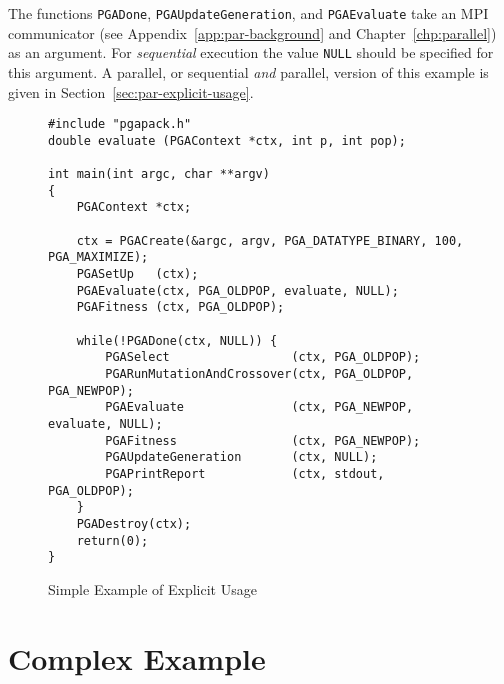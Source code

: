 \documentclass{report}
\begin{document}
The functions {\tt PGADone}, {\tt PGAUpdateGeneration}, and {\tt PGAEvaluate}
take an MPI communicator (see Appendix~\ref{app:par-background} and
Chapter~\ref{chp:parallel}) as an argument.  For {\em sequential} execution
the value {\tt NULL} should be specified for this argument.
A parallel, or sequential {\em and} parallel, version of this example is given
in Section~\ref{sec:par-explicit-usage}.

\begin{figure}
\begin{verbatim}
#include "pgapack.h"
double evaluate (PGAContext *ctx, int p, int pop);

int main(int argc, char **argv)
{
    PGAContext *ctx; 

    ctx = PGACreate(&argc, argv, PGA_DATATYPE_BINARY, 100, PGA_MAXIMIZE);
    PGASetUp   (ctx);
    PGAEvaluate(ctx, PGA_OLDPOP, evaluate, NULL);
    PGAFitness (ctx, PGA_OLDPOP);
    
    while(!PGADone(ctx, NULL)) {
        PGASelect                 (ctx, PGA_OLDPOP);
        PGARunMutationAndCrossover(ctx, PGA_OLDPOP, PGA_NEWPOP);
        PGAEvaluate               (ctx, PGA_NEWPOP, evaluate, NULL);
        PGAFitness                (ctx, PGA_NEWPOP);
        PGAUpdateGeneration       (ctx, NULL);
        PGAPrintReport            (ctx, stdout, PGA_OLDPOP);
    }
    PGADestroy(ctx);
    return(0);
}
\end{verbatim}
\caption{Simple Example of Explicit Usage}
\label{simple-example}
\end{figure}


\section{Complex Example}
\end{document}
